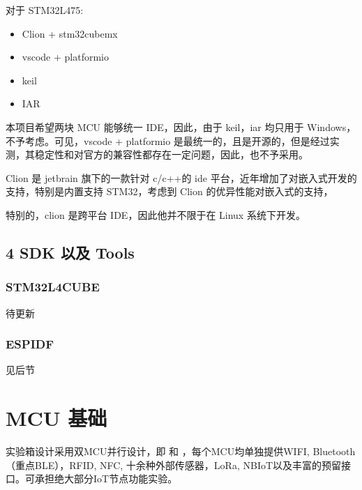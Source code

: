 \documentclass[a4paper,12pt,english]{sphinxmanual}
\begin{document}
\sphinxAtStartPar
对于 STM32L475:
\begin{itemize}
\item {} 
\sphinxAtStartPar
Clion + stm32cubemx

\item {} 
\sphinxAtStartPar
vscode + platformio

\item {} 
\sphinxAtStartPar
keil

\item {} 
\sphinxAtStartPar
IAR

\end{itemize}

\sphinxAtStartPar
本项目希望两块 MCU 能够统一 IDE，因此，由于 keil，iar 均只用于 Windows，不予考虑。可见，vscode + platformio 是最统一的，且是开源的，但是经过实测，其稳定性和对官方的兼容性都存在一定问题，因此，也不予采用。

\sphinxAtStartPar
Clion 是 jetbrain 旗下的一款针对 c/c++的 ide 平台，近年增加了对嵌入式开发的支持，特别是内置支持 STM32，考虑到 Clion 的优异性能对嵌入式的支持，

\sphinxAtStartPar
特别的，clion 是跨平台 IDE，因此他并不限于在 Linux 系统下开发。


\subsection{4 SDK 以及 Tools}
\label{\detokenize{dev-board/ide:sdk-tools}}

\subsubsection{STM32L4CUBE}
\label{\detokenize{dev-board/ide:stm32l4cube}}
\sphinxAtStartPar
待更新


\subsubsection{ESP\sphinxhyphen{}IDF}
\label{\detokenize{dev-board/ide:esp-idf}}
\sphinxAtStartPar
见后节

\sphinxstepscope


\section{MCU 基础}
\label{\detokenize{dev-board/mcu:mcu}}\label{\detokenize{dev-board/mcu::doc}}
\sphinxAtStartPar
实验箱设计采用双MCU并行设计，即  和 ，每个MCU均单独提供WIFI, Bluetooth（重点BLE），RFID, NFC, 十余种外部传感器，LoRa, NB\sphinxhyphen{}IoT以及丰富的预留接口。可承担绝大部分IoT节点功能实验。
\end{document}
